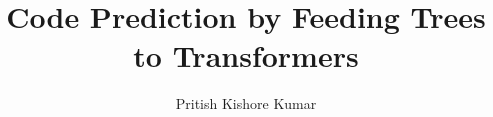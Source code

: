\documentclass[sigplan,screen,9pt]{acmart}
\begin{document}
\title{Code Prediction by Feeding Trees to Transformers}

\author{Pritish Kishore Kumar}




\maketitle
\end{document}
